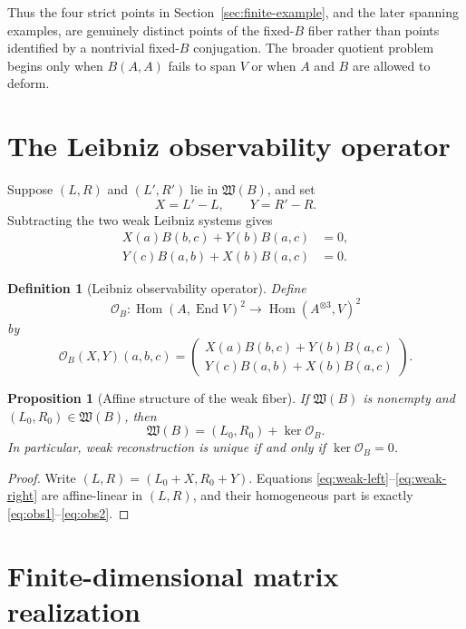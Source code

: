 \documentclass[11pt]{amsart}
\newtheorem{proposition}[theorem]{Proposition}
\newtheorem{definition}[theorem]{Definition}
\newcommand{\End}{\operatorname{End}}
\newcommand{\Hom}{\operatorname{Hom}}
\newcommand{\Wfib}{\mathfrak W}
\newcommand{\cO}{\mathcal O}
\begin{document}
Thus the four strict points in Section~\ref{sec:finite-example}, and the later spanning examples, are genuinely distinct points of the fixed-$B$ fiber rather than points identified by a nontrivial fixed-$B$ conjugation.  The broader quotient problem begins only when $B(A,A)$ fails to span $V$ or when $A$ and $B$ are allowed to deform.

\section{The Leibniz observability operator}

Suppose $(L,R)$ and $(L',R')$ lie in $\Wfib(B)$, and set
\[
X=L'-L,
\qquad
Y=R'-R.
\]
Subtracting the two weak Leibniz systems gives
\begin{align}
X(a)B(b,c)+Y(b)B(a,c)&=0, \label{eq:obs1}\\
Y(c)B(a,b)+X(b)B(a,c)&=0. \label{eq:obs2}
\end{align}

\begin{definition}[Leibniz observability operator]
Define
\[
\cO_B:\Hom(A,\End V)^2\longrightarrow \Hom(A^{\otimes3},V)^2
\]
by
\[
\cO_B(X,Y)(a,b,c)=
\begin{pmatrix}
X(a)B(b,c)+Y(b)B(a,c)\\
Y(c)B(a,b)+X(b)B(a,c)
\end{pmatrix}.
\]
\end{definition}

\begin{proposition}[Affine structure of the weak fiber]\label{prop:weak-affine}
If $\Wfib(B)$ is nonempty and $(L_0,R_0)\in\Wfib(B)$, then
\[
\Wfib(B)=(L_0,R_0)+\ker\cO_B.
\]
In particular, weak reconstruction is unique if and only if $\ker\cO_B=0$.
\end{proposition}

\begin{proof}
Write $(L,R)=(L_0+X,R_0+Y)$.  Equations \eqref{eq:weak-left}--\eqref{eq:weak-right} are affine-linear in $(L,R)$, and their homogeneous part is exactly \eqref{eq:obs1}--\eqref{eq:obs2}.
\end{proof}

\section{Finite-dimensional matrix realization}
\end{document}
